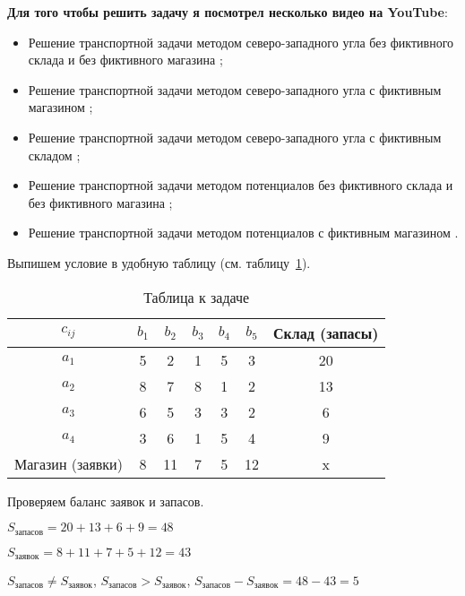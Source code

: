 \textbf{Для того чтобы решить задачу я посмотрел несколько видео на YouTube}:
\begin{itemize}
  \item Решение транспортной задачи методом северо-западного угла без фиктивного склада и без фиктивного магазина \cite{Youtube1};
  \item Решение транспортной задачи методом северо-западного угла с фиктивным магазином \cite{Youtube2};
  \item Решение транспортной задачи методом северо-западного угла с фиктивным складом \cite{Youtube3};
  \item Решение транспортной задачи методом потенциалов без фиктивного склада и без фиктивного магазина \cite{Youtube4};
  \item Решение транспортной задачи методом потенциалов с фиктивным магазином \cite{Youtube5}.
\end{itemize}

\newpage

Выпишем условие в удобную таблицу (см. таблицу~\ref{tab:1}).

\begin{table}[h!]
  \scriptsize

  \centering

  \caption{Таблица к задаче}
  \label{tab:1}

  \begin{tabular}{|c||c|c|c|c|c||c|} 
    \hline
    $c_{ij}$  &$b_1$ &$b_2$  &$b_3$  &$b_4$  &$b_5$  &Склад (запасы) \\ \hline
    \hline
    $a_1$             &5  &2  &1  &5  &3  &20 \\  \hline
    $a_2$             &8  &7  &8  &1  &2  &13 \\  \hline
    $a_3$             &6  &5  &3  &3  &2  &6  \\  \hline
    $a_4$             &3  &6  &1  &5  &4  &9  \\  \hline
    \hline
    Магазин (заявки)  &8  &11 &7  &5  &12 &x  \\  \hline
  \end{tabular}
\end{table}

Проверяем баланс заявок и запасов.

$S_{\text{запасов}} = 20+13+6+9=48$

$S_{\text{заявок}} = 8+11+7+5+12=43$

$S_{\text{запасов}} \neq S_{\text{заявок}}$,
$S_{\text{запасов}} > S_{\text{заявок}}$,
$S_{\text{запасов}} - S_{\text{заявок}} = 48 - 43 = 5$


